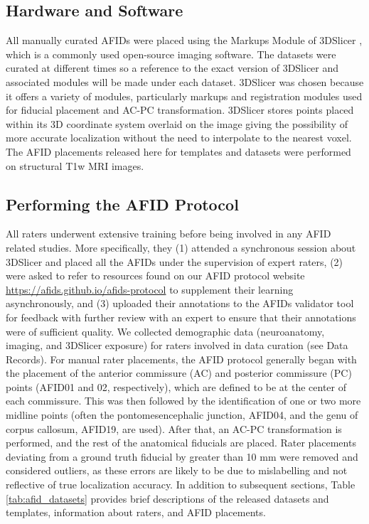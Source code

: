 \subsection{Hardware and Software}
All manually curated AFIDs were placed using the Markups Module of 3DSlicer \cite{Fedorov2012-rk}, which is a commonly used open-source imaging software. The datasets were curated at different times so a reference to the exact version of 3DSlicer and associated modules will be made under each dataset. 3DSlicer was chosen because it offers a variety of modules, particularly markups and registration modules used for fiducial placement and AC-PC transformation. 3DSlicer stores points placed within its 3D coordinate system overlaid on the image giving the possibility of more accurate localization without the need to interpolate to the nearest voxel. The AFID placements released here for templates and datasets were performed on structural T1w MRI images.

\subsection{Performing the AFID Protocol}
All raters underwent extensive training before being involved in any AFID related studies. More specifically, they (1) attended a synchronous session about 3DSlicer and placed all the AFIDs under the supervision of expert raters, (2) were asked to refer to resources found on our AFID protocol website \url{https://afids.github.io/afids-protocol} to supplement their learning asynchronously, and (3) uploaded their annotations to the AFIDs validator tool for feedback with further review with an expert to ensure that their annotations were of sufficient quality. We collected demographic data (neuroanatomy, imaging, and 3DSlicer exposure) for raters involved in data curation (see Data Records).
For manual rater placements, the AFID protocol generally began with the placement of the anterior commissure (AC) and posterior commissure (PC) points (AFID01 and 02, respectively), which are defined to be at the center of each commissure. This was then followed by the identification of one or two more midline points (often the pontomesencephalic junction, AFID04, and the genu of corpus callosum, AFID19, are used). After that, an AC-PC transformation is performed, and the rest of the anatomical fiducials are placed. Rater placements deviating from a ground truth fiducial by greater than 10 mm were removed and considered outliers, as these errors are likely to be due to mislabelling and not reflective of true localization accuracy. In addition to subsequent sections, Table \ref{tab:afid_datasets} provides brief descriptions of the released datasets and templates, information about raters, and AFID placements.

